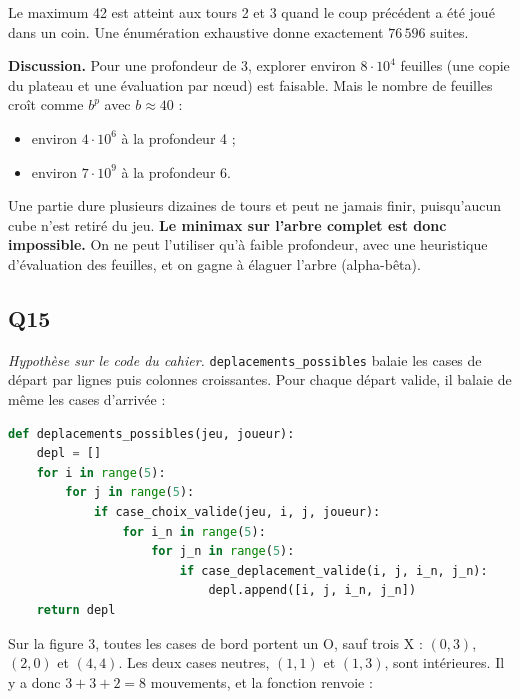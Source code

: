 \documentclass[11pt,a4paper]{article}
\providecommand{\tightlist}{\setlength{\itemsep}{0pt}\setlength{\parskip}{0pt}}
\newcommand{\equationajustee}[1]{%
  \sbox{\boiteequation}{$\displaystyle #1$}%
  \ifdim\wd\boiteequation>\linewidth
    \[\resizebox{\linewidth}{!}{\usebox{\boiteequation}}\]%
  \else
    \[#1\]%
  \fi}
\begin{document}
\equationajustee{\boxed{44\times42\times42=77\,616\approx 8\cdot10^4\ \text{suites de 3 coups au plus.}}}

Le maximum 42 est atteint aux tours 2 et 3 quand le coup précédent a été joué dans un coin. Une énumération exhaustive donne exactement \(76\,596\) suites.

\textbf{Discussion.} Pour une profondeur de 3, explorer environ \(8\cdot10^4\) feuilles (une copie du plateau et une évaluation par nœud) est faisable. Mais le nombre de feuilles croît comme \(b^p\) avec \(b\approx 40\) :

\begin{itemize}
\tightlist
\item
  environ \(4\cdot10^6\) à la profondeur 4 ;
\item
  environ \(7\cdot10^9\) à la profondeur 6.
\end{itemize}

Une partie dure plusieurs dizaines de tours et peut ne jamais finir, puisqu'aucun cube n'est retiré du jeu. \textbf{Le minimax sur l'arbre complet est donc impossible.} On ne peut l'utiliser qu'à faible profondeur, avec une heuristique d'évaluation des feuilles, et on gagne à élaguer l'arbre (alpha-bêta).

\hypertarget{q15}{%
\subsection{Q15}\label{q15}}

\emph{Hypothèse sur le code du cahier.} \texttt{deplacements\_possibles} balaie les cases de départ par lignes puis colonnes croissantes. Pour chaque départ valide, il balaie de même les cases d'arrivée :

\begin{lstlisting}[language=Python]
def deplacements_possibles(jeu, joueur):
    depl = []
    for i in range(5):
        for j in range(5):
            if case_choix_valide(jeu, i, j, joueur):
                for i_n in range(5):
                    for j_n in range(5):
                        if case_deplacement_valide(i, j, i_n, j_n):
                            depl.append([i, j, i_n, j_n])
    return depl
\end{lstlisting}

Sur la figure 3, toutes les cases de bord portent un O, sauf trois X : \((0,3)\), \((2,0)\) et \((4,4)\). Les deux cases neutres, \((1,1)\) et \((1,3)\), sont intérieures. Il y a donc \(3+3+2=8\) mouvements, et la fonction renvoie :
\equationajustee{\boxed{\begin{aligned}\lbrack&[0,3,0,0],\ [0,3,0,4],\ [0,3,4,3],\\ &[2,0,0,0],\ [2,0,2,4],\ [2,0,4,0],\\ &[4,4,0,4],\ [4,4,4,0]]\end{aligned}}}
\end{document}
